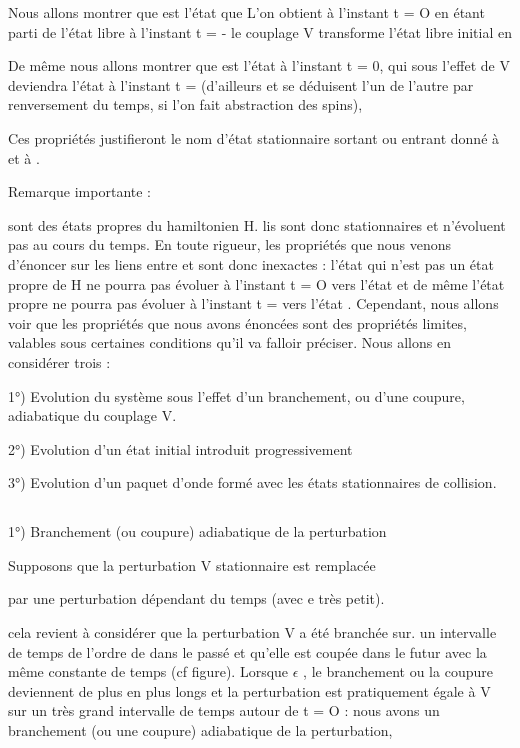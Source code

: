 Nous allons montrer que  est l'état que L'on obtient
à l'instant t = O en étant parti de l'état libre  à l'instant
t = -  le couplage V transforme l'état libre initial  en 

De même nous allons montrer que  est l'état à l'instant t = 0, qui
sous l'effet de V deviendra l'état  à l'instant t =  (d'ailleurs
 et  se déduisent l'un de l'autre par renversement du temps,
si l'on fait abstraction des spins),

Ces propriétés justifieront le nom d'état stationnaire
sortant ou entrant donné à  et à .

Remarque importante :

 sont des états propres du hamiltonien H. lis sont donc stationnaires et
 n'évoluent pas au cours du temps. En toute rigueur, les propriétés
que nous venons d'énoncer sur les liens entre et   sont donc
inexactes : l'état  qui n'est pas un état propre de H ne pourra pas
évoluer à l'instant t = O vers l'état  et de même l'état propre
 ne pourra pas évoluer à l'instant t =  vers l'état .
Cependant, nous allons voir que les propriétés que nous avons énoncées
sont des propriétés limites, valables sous certaines conditions qu'il va
falloir préciser. Nous allons en considérer trois :

1°) Evolution du système sous l'effet d'un branchement, ou
d'une coupure, adiabatique du couplage V.

2°) Evolution d'un état initial introduit progressivement
 

3°) Evolution d'un paquet d'onde formé avec les états stationnaires de collision.

\subsection{}%
1°) Branchement (ou coupure) adiabatique de la perturbation

Supposons que la perturbation V stationnaire est remplacée

par une perturbation dépendant du temps
(avec e très petit).

cela revient à considérer que la perturbation V a été branchée sur. un intervalle
de temps de l'ordre de  dans le passé et qu'elle est coupée
dans le futur avec la même constante de temps (cf figure). Lorsque $\epsilon$ ,
le branchement ou la coupure deviennent de plus en plus longs et la perturbation
est pratiquement égale à V sur un très grand intervalle de temps autour de t = O :
nous avons un branchement (ou une coupure) adiabatique de
la perturbation,

